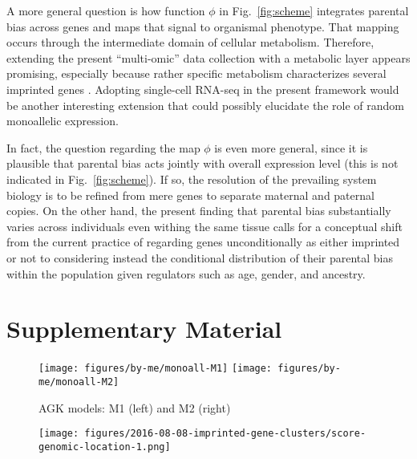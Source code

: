 \documentclass[letterpaper]{article}
\begin{document}
A more general question is how function \(\phi\) in Fig.~\ref{fig:scheme}
integrates parental bias across genes and maps that signal to organismal
phenotype.  That mapping occurs through the intermediate domain of cellular
metabolism.  Therefore, extending the present ``multi-omic'' data collection
with a metabolic layer appears promising, especially because rather specific
metabolism characterizes several imprinted genes \cite{Tucci2016,Peters2014}.
Adopting single-cell RNA-seq in the present framework would be another
interesting extension that could possibly elucidate the role of random
monoallelic expression.

In fact, the question regarding the map \(\phi\) is even more general, since
it is plausible that parental bias acts jointly with overall expression level
(this is not indicated in Fig.~\ref{fig:scheme}).  If so, the resolution of
the prevailing system biology is to be refined from mere genes to separate
maternal and paternal copies.  On the other hand, the present finding that
parental bias substantially varies across individuals even withing the same
tissue calls for a conceptual shift from the current practice of regarding
genes unconditionally as either imprinted or not to considering instead the
conditional distribution of their parental bias within the population given
regulators such as age, gender, and ancestry.



\section{Supplementary Material}

\newpage


\setcounter{figure}{0}
\makeatletter 
\renewcommand{\thefigure}{S\@arabic\c@figure}
\makeatother

\begin{figure}
\begin{center}
\texttt{[image: figures/by-me/monoall-M1]}
\hspace{\fill}
\texttt{[image: figures/by-me/monoall-M2]}
\end{center}
\caption{AGK models: M1 (left) and M2 (right)}
\label{fig:agk}
\end{figure}

\begin{figure}
\begin{center}
\texttt{[image: figures/2016-08-08-imprinted-gene-clusters/score-genomic-location-1.png]}
\end{center}
\caption{}
\label{fig:clusters}
\end{figure}
\end{document}
